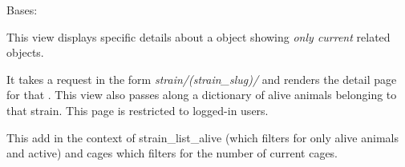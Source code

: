 \documentclass[letterpaper,10pt,english]{sphinxmanual}
\begin{document}

\begin{fulllineitems}
\label{api:mousedb.animal.views.StrainDetail}
Bases: {\hyperref[api:mousedb.views.ProtectedDetailView]{}}

This view displays specific details about a {\hyperref[api:mousedb.animal.models.Strain]{}} object showing \emph{only current} related objects.

It takes a request in the form \emph{strain/(strain\_slug)/} and renders the detail page for that {\hyperref[api:mousedb.animal.models.Strain]{}}.
This view also passes along a dictionary of alive animals belonging to that strain.
This page is restricted to logged-in users.

\begin{fulllineitems}
\label{api:mousedb.animal.views.StrainDetail.context_object_name}
\end{fulllineitems}


\begin{fulllineitems}
\label{api:mousedb.animal.views.StrainDetail.get_context_data}
This add in the context of strain\_list\_alive (which filters for only alive animals and active) and cages which filters for the number of current cages.

\end{fulllineitems}


\begin{fulllineitems}
\label{api:mousedb.animal.views.StrainDetail.queryset}
\end{fulllineitems}


\end{fulllineitems}
\end{document}
